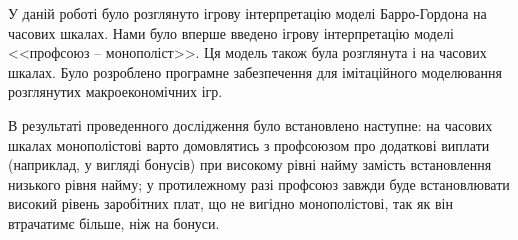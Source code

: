 
У даній роботі було розглянуто ігрову інтерпретацію моделі Барро-Гордона на часових шкалах. Нами було вперше введено ігрову інтерпретацію моделі <<профсоюз -- монополіст>>. Ця модель також була розглянута і на часових шкалах. Було розроблено програмне забезпечення для імітаційного моделювання розглянутих макроекономічних ігр.

В результаті проведенного дослідження було встановлено наступне: на часових шкалах монополістові варто домовлятись з профсоюзом про додаткові виплати (наприклад, у вигляді бонусів) при високому рівні найму замість встановлення низького рівня найму; у протилежному разі профсоюз завжди буде встановлювати високий рівень заробітних плат, що не вигідно монополістові, так як він втрачатимє більше, ніж на бонуси.
